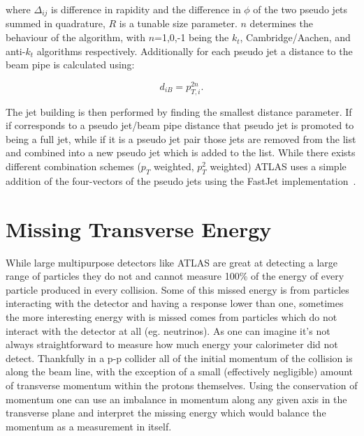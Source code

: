 where $\Delta_{ij}$ is difference in rapidity and the difference in $\phi$ of the two pseudo jets summed in quadrature, $R$ is a tunable size parameter.  
$n$ determines the behaviour of the algorithm, with $n$=1,0,-1 being the $k_t$, Cambridge/Aachen, and anti-$k_t$ algorithms respectively.  
Additionally for each pseudo jet a distance to the beam pipe is calculated using:

\begin{equation}
  d_{iB} = p_{T,i}^{2n}.
\end{equation}  

The jet building is then performed by finding the smallest distance parameter.  
If if corresponds to a pseudo jet/beam pipe distance that pseudo jet is promoted to being a full jet, while if it is a pseudo jet pair those jets are removed from the list and combined into a new pseudo jet which is added to the list.  
While there exists different combination schemes ($p_T$ weighted, $p_T^2$ weighted) ATLAS uses a simple addition of the four-vectors of the pseudo jets using the FastJet implementation~\cite{Cacciari:2011ma}.

\section{Missing Transverse Energy}

While large multipurpose detectors like ATLAS are great at detecting a large range of particles they do not and cannot measure 100\% of the energy of every particle produced in every collision.  
Some of this missed energy is from particles interacting with the detector and having a response lower than one, sometimes the more interesting energy with is missed comes from particles which do not interact with the detector at all (eg. neutrinos).  
As one can imagine it's not always straightforward to measure how much energy your calorimeter did not detect.  
Thankfully in a p-p collider all of the initial momentum of the collision is along the beam line, with the exception of a small (effectively negligible) amount of transverse momentum within the protons themselves.  
Using the conservation of momentum one can use an imbalance in momentum along any given axis in the transverse plane and interpret the missing energy which would balance the momentum as a measurement in itself.  



